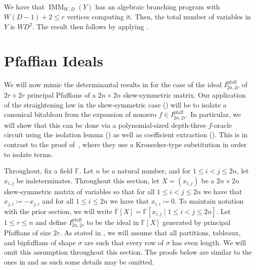\documentclass[10pt,a4paper]{amsart}
\DeclareMathOperator{\pfaff}{pfaff}
\DeclareMathOperator{\IMM}{IMM}
\newcommand*\F{\mathbb{F}}
\newcommand*\defeq{\coloneqq}
\begin{document}
\begin{pf}
    We have that $\IMM_{W, D}(Y)$ has an algebraic branching program with $W(D-1) + 2 \leq r$ vertices computing it.
    Then, the total number of variables in $Y$ is $WD^2$.
    The result then follows by applying .
\end{pf} 

\section{Pfaffian Ideals}\label{sec:pfaff}

We will now mimic the determinantal results in  for the case of the ideal $I^{\pfaff}_{2n, 2r}$ of $2r \times 2r$ principal Pfaffians of a $2n \times 2n$ skew-symmetric matrix.
Our application of the straightening law in the skew-symmetric case () will be to isolate a canonical bitableau from the expansion of nonzero $f \in I^{\pfaff}_{2n, 2r}$.
In particular, we will show that this can be done via a polynomial-sized depth-three $f$-oracle circuit using the isolation lemma () as well as coefficient extraction ().
This is in contrast to the proof of~\cite{AF21}, where they use a Kronecker-type substitution in order to isolate terms.

Throughout, fix a field $\F$.
Let $n$ be a natural number, and for $1 \leq i < j \leq 2n$, let $x_{i, j}$ be indeterminates.
Throughout this section, let $X = (x_{i, j})$ be a $2n \times 2n$ skew-symmetric matrix of variables so that for all $1 \leq i < j \leq 2n$ we have that $x_{j, i} \defeq -x_{j, i}$ and for all $1 \leq i \leq 2n$ we have that $x_{i, i} \defeq 0$.
To maintain notation with the prior section, we will write $\F[X] = \F[x_{i, j} \mid 1 \leq i < j \leq 2n]$.
Let $1 \leq r \leq n$ and define $I^{\pfaff}_{2n, 2r}$ to be the ideal in $\F[X]$ generated by principal Pfaffians of size $2r$.
As stated in , we will assume that all partitions, tableaux, and bipfaffians of shape $\sigma$ are such that every row of $\sigma$ has even length.
We will omit this assumption throughout this section.
The proofs below are similar to the ones in  and as such some details may be omitted.
\end{document}
